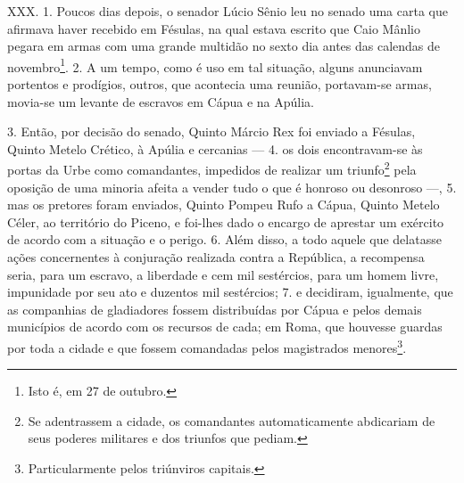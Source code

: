 XXX. 1. Poucos dias depois, o senador Lúcio Sênio leu no senado uma carta que
afirmava haver recebido em Fésulas, na qual estava escrito que Caio Mânlio
pegara em armas com uma grande multidão no sexto dia antes das calendas de
novembro\footnote{Isto é, em 27 de outubro.}. 2. A um tempo, como é uso em tal
situação, alguns anunciavam portentos e prodígios, outros, que acontecia uma
reunião, portavam-se armas, movia-se um levante de escravos em Cápua e na
Apúlia.

3. Então, por decisão do senado, Quinto Márcio Rex foi enviado a Fésulas,
Quinto Metelo Crético, à Apúlia e cercanias --- 4. os dois encontravam-se às
portas da Urbe como comandantes, impedidos de realizar um triunfo\footnote{Se
adentrassem a cidade, os comandantes automaticamente abdicariam de seus poderes
militares e dos triunfos que pediam.} pela oposição de uma minoria afeita a
vender tudo o que é honroso ou desonroso ---, 5. mas os pretores foram
enviados, Quinto Pompeu Rufo a Cápua, Quinto Metelo Céler, ao território do Piceno,
e foi-lhes dado o encargo de aprestar um exército de acordo com a situação e o
perigo. 6. Além disso, a todo aquele que delatasse ações concernentes à
conjuração realizada contra a República, a recompensa seria, para um escravo, a
liberdade e cem mil sestércios, para um homem livre, impunidade por seu ato e
duzentos mil sestércios; 7. e decidiram, igualmente, que as companhias de
gladiadores fossem distribuídas por Cápua e pelos demais municípios de acordo
com os recursos de cada; em Roma, que houvesse guardas por toda a cidade e que
fossem comandadas pelos magistrados menores\footnote{Particularmente pelos
triúnviros capitais.}.

